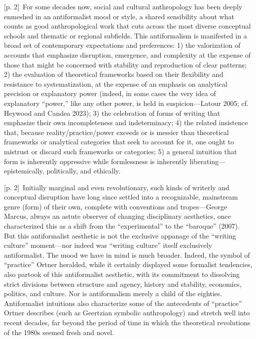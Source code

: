 \documentclass[10pt,a4paper]{article}
\begin{document}
{\scriptsize\color{gray} [p. 2]}\ For some decades now, social and cultural anthropology has been deeply enmeshed in an antiformalist mood or style, a shared sensibility about what counts as good anthropological work that cuts across the most diverse conceptual schools and thematic or regional subfields. This antiformalism is manifested in a broad set of contemporary expectations and preferences: 1) the valorization of accounts that emphasize disruption, emergence, and complexity at the expense of those that might be concerned with stability and reproduction of clear patterns; 2) the evaluation of theoretical frameworks based on their flexibility and resistance to systematization, at the expense of an emphasis on analytical precision or explanatory power (indeed, in some cases the very idea of explanatory “power,” like any other power, is held in suspicion—Latour 2005; cf. Heywood and Candea 2023); 3) the celebration of forms of writing that emphasize their own incompleteness and indeterminacy; 4) the related insistence that, because reality/practice/power exceeds or is messier than theoretical frameworks or analytical categories that seek to account for it, one ought to mistrust or discard such frameworks or categories; 5) a general intuition that form is inherently oppressive while formlessness is inherently liberating—epistemically, politically, and ethically.\par
{\scriptsize\color{gray} [p. 2]}\ Initially marginal and even revolutionary, such kinds of writerly and conceptual disruption have long since settled into a recognizable, mainstream genre (form) of their own, complete with conventions and tropes—George Marcus, always an astute observer of changing disciplinary aesthetics, once characterized this as a shift from the “experimental” to the “baroque” (2007). But this antiformalist aesthetic is not the exclusive appanage of the “writing culture” moment—nor indeed was “writing culture” itself exclusively antiformalist. The mood we have in mind is much broader. Indeed, the symbol of “practice” Ortner heralded, while it certainly displayed some formalist tendencies, also partook of this antiformalist aesthetic, with its commitment to dissolving strict divisions between structure and agency, history and stability, economics, politics, and culture. Nor is antiformalism merely a child of the eighties. Antiformalist intuitions also characterize some of the antecedents of “practice” Ortner describes (such as Geertzian symbolic anthropology) and stretch well into recent decades, far beyond the period of time in which the theoretical revolutions of the 1980s seemed fresh and novel.\par
\end{document}
